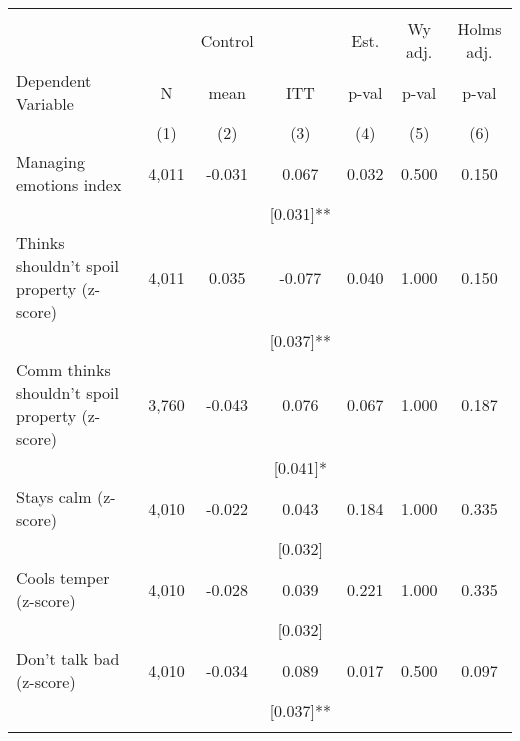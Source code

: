 \begin{tabular}{lcccccc}
\hline \noalign{\smallskip} &  &  &  &  &  & \\
 &  & Control &  & Est. & Wy adj. & Holms adj.\\
Dependent Variable & N & mean & ITT & p-val & p-val & p-val\\
 & (1) & (2) & (3) & (4) & (5) & (6)\\
\noalign{\smallskip}\hline \noalign{\smallskip}Managing emotions index & 4,011 & -0.031 & 0.067 & 0.032 & 0.500 & 0.150\\
 &  &  & [0.031]** &  &  & \\
\quad Thinks shouldn't spoil property (z-score) & 4,011 & 0.035 & -0.077 & 0.040 & 1.000 & 0.150\\
 &  &  & [0.037]** &  &  & \\
\quad Comm thinks shouldn't spoil property (z-score) & 3,760 & -0.043 & 0.076 & 0.067 & 1.000 & 0.187\\
 &  &  & [0.041]* &  &  & \\
\quad Stays calm (z-score) & 4,010 & -0.022 & 0.043 & 0.184 & 1.000 & 0.335\\
 &  &  & [0.032] &  &  & \\
\quad Cools temper (z-score) & 4,010 & -0.028 & 0.039 & 0.221 & 1.000 & 0.335\\
 &  &  & [0.032] &  &  & \\
\quad Don't talk bad (z-score) & 4,010 & -0.034 & 0.089 & 0.017 & 0.500 & 0.097\\
 &  &  & [0.037]** &  &  & \\
\noalign{\smallskip}\hline\end{tabular}

